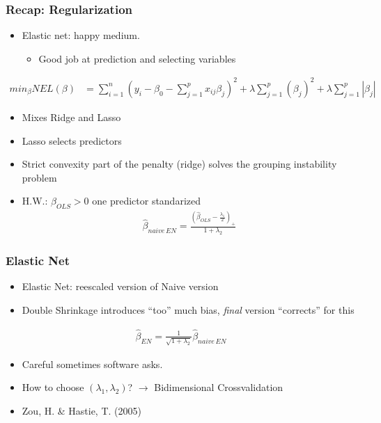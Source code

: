\documentclass[
  shownotes,
  xcolor={svgnames},
  hyperref={colorlinks,citecolor=DarkBlue,linkcolor=DarkRed,urlcolor=DarkBlue}
  , aspectratio=169]{beamer}
\begin{document}
\begin{frame}[fragile]
\frametitle{Recap: Regularization}

\begin{itemize}
\item Elastic net: happy medium. 
  \begin{itemize}
    \item Good job at prediction and selecting variables
  \end{itemize}
\end{itemize}

\begin{align}
min_{\beta} NEL(\beta) &= \sum_{i=1}^n (y_i-\beta_0 - \sum_{j=1}^p x_{ij}\beta_j)^2 + \lambda \sum_{j=1}^p (\beta_j)^2 + \lambda \sum_{j=1}^p |\beta_j| 
\end{align}


\begin{itemize}
 \item Mixes Ridge and Lasso
 \item Lasso selects predictors
 \item Strict convexity part  of the penalty (ridge) solves the grouping instability problem 
 \scriptsize
 \item H.W.: $\beta_{OLS}>0$ one predictor standarized
 \begin{align}
\hat{\beta}_{naive\,EN}= \frac{\left(\hat{\beta}_{OLS}-\frac{\lambda_1}{2}\right)_{+}}{1+\lambda_2}
\end{align}
\end{itemize}

\end{frame}

\begin{frame}[fragile]
\frametitle{Elastic Net}

\begin{itemize}
\item Elastic Net: reescaled version of Naive version
\item Double Shrinkage introduces ``too'' much bias, {\it final} version ``corrects'' for this
\end{itemize}
\bigskip
\begin{align}
\hat{\beta}_{EN}= \frac{1}{\sqrt{1+\lambda_2}}\hat{\beta}_{naive\,EN}
\end{align}
\bigskip
\begin{itemize}
  \item Careful sometimes software asks.
  \item How to choose $(\lambda_1,\lambda_2)$? $\rightarrow$ Bidimensional Crossvalidation
  \item Zou, H. \& Hastie, T. (2005)
\end{itemize}

\end{frame}
\end{document}
